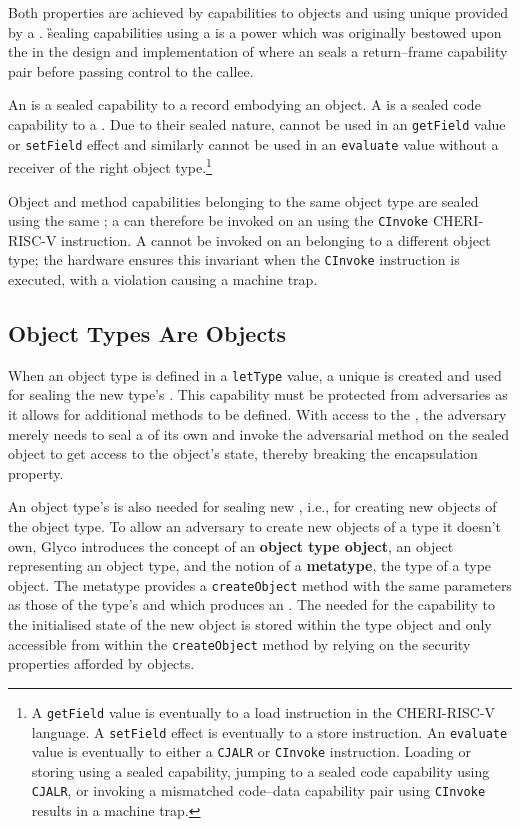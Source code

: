 \documentclass[main.tex]{subfiles}
\begin{document}
Both properties are achieved by  capabilities to objects and  using unique  provided by a . \G{sealing} capabilities using a  is a power which was originally bestowed upon the  in the design and implementation of  where an  seals a return–frame capability pair before passing control to the callee.

An \textbf{} is a sealed capability to a record embodying an object. A \textbf{} is a sealed code capability to a . Due to their sealed nature,  cannot be used in an \texttt{getField} value or \texttt{setField} effect and similarly  cannot be used in an \texttt{evaluate} value without a receiver of the right object type.\footnote{A \texttt{getField} value is eventually \lowered{} to a load instruction in the CHERI-RISC-V language. A \texttt{setField} effect is eventually \lowered{} to a store instruction. An \texttt{evaluate} value is eventually \lowered{} to either a \texttt{CJALR} or \texttt{CInvoke} instruction. Loading or storing using a sealed capability, jumping to a sealed code capability using \texttt{CJALR}, or invoking a mismatched code–data capability pair using \texttt{CInvoke} results in a machine trap.}

Object and method capabilities belonging to the same object type are sealed using the same ; a  can therefore be invoked on an  using the \texttt{CInvoke} CHERI-RISC-V instruction. A  cannot be invoked on an  belonging to a different object type; the hardware ensures this invariant when the \texttt{CInvoke} instruction is executed, with a violation causing a machine trap.

\subsection{Object Types Are Objects}
When an object type is defined in a \texttt{letType} value, a unique  is created and used for sealing the new type's . This capability must be protected from adversaries as it allows for additional methods to be defined. With access to the , the adversary merely needs to seal a  of its own and invoke the adversarial method on the sealed object to get access to the object's state, thereby breaking the encapsulation property.

An object type's  is also needed for sealing new , i.e., for creating new objects of the object type. To allow an adversary to create new objects of a type it doesn't own, Glyco introduces the concept of an \textbf{object type object}, an object representing an object type, and the notion of a \textbf{metatype}, the type of a type object. The metatype provides a \texttt{createObject} method with the same parameters as those of the type's  and which produces an . The  needed for  the capability to the initialised state of the new object is stored within the type object and only accessible from within the \texttt{createObject} method by relying on the security properties afforded by objects.
\end{document}
